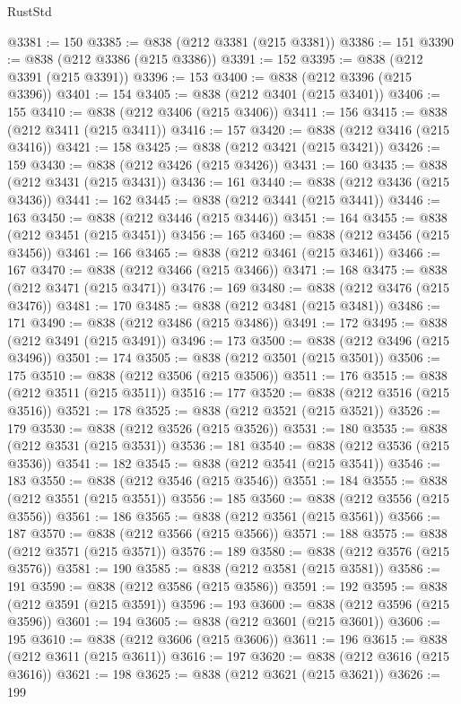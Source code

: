 \begin{lexlean}{RustStd}
\begin{coremodule}
@3381 := 150
@3385 := @838 (@212 @3381 (@215 @3381))
@3386 := 151
@3390 := @838 (@212 @3386 (@215 @3386))
@3391 := 152
@3395 := @838 (@212 @3391 (@215 @3391))
@3396 := 153
@3400 := @838 (@212 @3396 (@215 @3396))
@3401 := 154
@3405 := @838 (@212 @3401 (@215 @3401))
@3406 := 155
@3410 := @838 (@212 @3406 (@215 @3406))
@3411 := 156
@3415 := @838 (@212 @3411 (@215 @3411))
@3416 := 157
@3420 := @838 (@212 @3416 (@215 @3416))
@3421 := 158
@3425 := @838 (@212 @3421 (@215 @3421))
@3426 := 159
@3430 := @838 (@212 @3426 (@215 @3426))
@3431 := 160
@3435 := @838 (@212 @3431 (@215 @3431))
@3436 := 161
@3440 := @838 (@212 @3436 (@215 @3436))
@3441 := 162
@3445 := @838 (@212 @3441 (@215 @3441))
@3446 := 163
@3450 := @838 (@212 @3446 (@215 @3446))
@3451 := 164
@3455 := @838 (@212 @3451 (@215 @3451))
@3456 := 165
@3460 := @838 (@212 @3456 (@215 @3456))
@3461 := 166
@3465 := @838 (@212 @3461 (@215 @3461))
@3466 := 167
@3470 := @838 (@212 @3466 (@215 @3466))
@3471 := 168
@3475 := @838 (@212 @3471 (@215 @3471))
@3476 := 169
@3480 := @838 (@212 @3476 (@215 @3476))
@3481 := 170
@3485 := @838 (@212 @3481 (@215 @3481))
@3486 := 171
@3490 := @838 (@212 @3486 (@215 @3486))
@3491 := 172
@3495 := @838 (@212 @3491 (@215 @3491))
@3496 := 173
@3500 := @838 (@212 @3496 (@215 @3496))
@3501 := 174
@3505 := @838 (@212 @3501 (@215 @3501))
@3506 := 175
@3510 := @838 (@212 @3506 (@215 @3506))
@3511 := 176
@3515 := @838 (@212 @3511 (@215 @3511))
@3516 := 177
@3520 := @838 (@212 @3516 (@215 @3516))
@3521 := 178
@3525 := @838 (@212 @3521 (@215 @3521))
@3526 := 179
@3530 := @838 (@212 @3526 (@215 @3526))
@3531 := 180
@3535 := @838 (@212 @3531 (@215 @3531))
@3536 := 181
@3540 := @838 (@212 @3536 (@215 @3536))
@3541 := 182
@3545 := @838 (@212 @3541 (@215 @3541))
@3546 := 183
@3550 := @838 (@212 @3546 (@215 @3546))
@3551 := 184
@3555 := @838 (@212 @3551 (@215 @3551))
@3556 := 185
@3560 := @838 (@212 @3556 (@215 @3556))
@3561 := 186
@3565 := @838 (@212 @3561 (@215 @3561))
@3566 := 187
@3570 := @838 (@212 @3566 (@215 @3566))
@3571 := 188
@3575 := @838 (@212 @3571 (@215 @3571))
@3576 := 189
@3580 := @838 (@212 @3576 (@215 @3576))
@3581 := 190
@3585 := @838 (@212 @3581 (@215 @3581))
@3586 := 191
@3590 := @838 (@212 @3586 (@215 @3586))
@3591 := 192
@3595 := @838 (@212 @3591 (@215 @3591))
@3596 := 193
@3600 := @838 (@212 @3596 (@215 @3596))
@3601 := 194
@3605 := @838 (@212 @3601 (@215 @3601))
@3606 := 195
@3610 := @838 (@212 @3606 (@215 @3606))
@3611 := 196
@3615 := @838 (@212 @3611 (@215 @3611))
@3616 := 197
@3620 := @838 (@212 @3616 (@215 @3616))
@3621 := 198
@3625 := @838 (@212 @3621 (@215 @3621))
@3626 := 199

\end{coremodule}
\end{lexlean}
